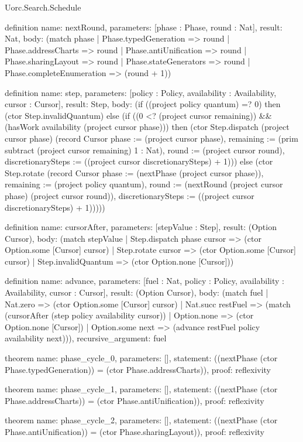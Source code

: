 \begin{lexlean}{Uorc.Search.Schedule}
\begin{semanticmodule}
definition{
  name: nextRound,
  parameters: [phase : Phase, round : Nat],
  result: Nat,
  body: (match phase
    | Phase.typedGeneration => round
    | Phase.addressCharts => round
    | Phase.antiUnification => round
    | Phase.sharingLayout => round
    | Phase.stateGenerators => round
    | Phase.completeEnumeration => (round + 1))
}

definition{
  name: step,
  parameters: [policy : Policy, availability : Availability, cursor : Cursor],
  result: Step,
  body: (if ((project policy quantum) =? 0) then (ctor Step.invalidQuantum) else (if ((0 <? (project cursor remaining)) && (hasWork availability (project cursor phase))) then (ctor Step.dispatch (project cursor phase) (record Cursor {phase := (project cursor phase), remaining := (prim subtract (project cursor remaining) 1 : Nat), round := (project cursor round), discretionarySteps := ((project cursor discretionarySteps) + 1)})) else (ctor Step.rotate (record Cursor {phase := (nextPhase (project cursor phase)), remaining := (project policy quantum), round := (nextRound (project cursor phase) (project cursor round)), discretionarySteps := ((project cursor discretionarySteps) + 1)}))))
}

definition{
  name: cursorAfter,
  parameters: [stepValue : Step],
  result: (Option Cursor),
  body: (match stepValue
    | Step.dispatch phase cursor => (ctor Option.some [Cursor] cursor)
    | Step.rotate cursor => (ctor Option.some [Cursor] cursor)
    | Step.invalidQuantum => (ctor Option.none [Cursor]))
}

definition{
  name: advance,
  parameters: [fuel : Nat, policy : Policy, availability : Availability, cursor : Cursor],
  result: (Option Cursor),
  body: (match fuel
    | Nat.zero => (ctor Option.some [Cursor] cursor)
    | Nat.succ restFuel => (match (cursorAfter (step policy availability cursor))
      | Option.none => (ctor Option.none [Cursor])
      | Option.some next => (advance restFuel policy availability next))),
  recursive_argument: fuel
}

theorem{
  name: phase_cycle_0,
  parameters: [],
  statement: ((nextPhase (ctor Phase.typedGeneration)) = (ctor Phase.addressCharts)),
  proof: reflexivity{}
}

theorem{
  name: phase_cycle_1,
  parameters: [],
  statement: ((nextPhase (ctor Phase.addressCharts)) = (ctor Phase.antiUnification)),
  proof: reflexivity{}
}

theorem{
  name: phase_cycle_2,
  parameters: [],
  statement: ((nextPhase (ctor Phase.antiUnification)) = (ctor Phase.sharingLayout)),
  proof: reflexivity{}
}


\end{semanticmodule}
\end{lexlean}
